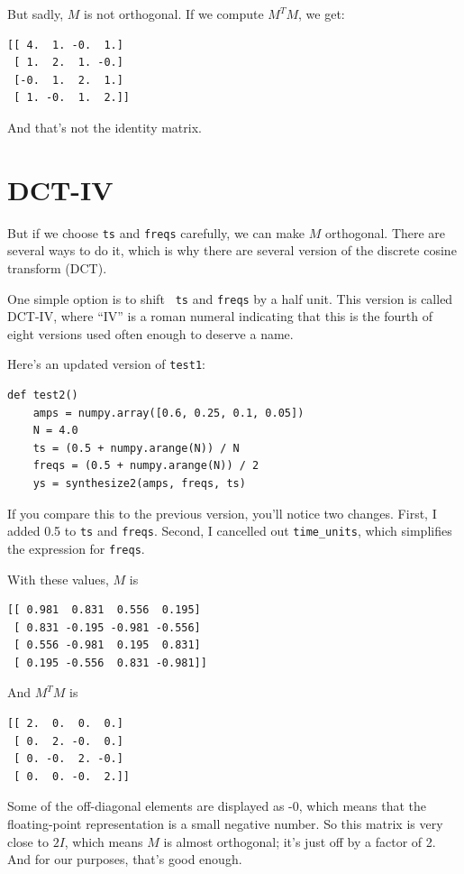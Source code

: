 \documentclass[12pt]{book}
\begin{document}
But sadly, $M$ is not orthogonal.  If we compute $M^TM$, we get:

\begin{verbatim}
[[ 4.  1. -0.  1.]
 [ 1.  2.  1. -0.]
 [-0.  1.  2.  1.]
 [ 1. -0.  1.  2.]]
\end{verbatim}

And that's not the identity matrix.


\section{DCT-IV}

But if we choose {\tt ts} and {\tt freqs} carefully,
we can make $M$ orthogonal.  There are several ways to do it, which
is why there are several version of the discrete cosine transform (DCT).

One simple option is to shift {\tt
  ts} and {\tt freqs} by a half unit.  This version is called DCT-IV,
where ``IV'' is a roman numeral indicating that this is the fourth of
eight versions used often enough to deserve a name.

Here's an updated version of
{\tt test1}:

\begin{verbatim}
def test2()
    amps = numpy.array([0.6, 0.25, 0.1, 0.05])
    N = 4.0
    ts = (0.5 + numpy.arange(N)) / N
    freqs = (0.5 + numpy.arange(N)) / 2
    ys = synthesize2(amps, freqs, ts)
\end{verbatim}

If you compare this to the previous version, you'll notice
two changes.  First, I added 0.5 to {\tt ts} and {\tt freqs}.
Second, I cancelled out \verb"time_units", which simplifies
the expression for {\tt freqs}.

With these values, $M$ is

\begin{verbatim}
[[ 0.981  0.831  0.556  0.195]
 [ 0.831 -0.195 -0.981 -0.556]
 [ 0.556 -0.981  0.195  0.831]
 [ 0.195 -0.556  0.831 -0.981]]
\end{verbatim}

And $M^TM$ is

\begin{verbatim}
[[ 2.  0.  0.  0.]
 [ 0.  2. -0.  0.]
 [ 0. -0.  2. -0.]
 [ 0.  0. -0.  2.]]
\end{verbatim}

Some of the off-diagonal elements are displayed as -0, which means
that the floating-point representation is a small negative number.  So
this matrix is very close to $2I$, which means $M$ is almost
orthogonal; it's just off by a factor of 2.  And for our purposes,
that's good enough.
\end{document}
